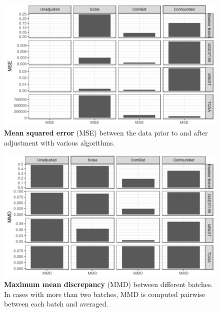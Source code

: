 \documentclass[notitlepage]{article}
\begin{document}
\begin{figure}
	\centering
	\includegraphics[width=4.5in]{figures/rough/mse}
	\caption{\textbf{Mean squared error} (MSE) between the data prior to and after adjustment with various algorithms.}
	\label{fig:mse}
\end{figure}
\begin{figure}
	\centering
	\includegraphics[width=4.5in]{figures/rough/mmd}
	\caption{\textbf{Maximum mean discrepancy} (MMD) between different batches.
	In cases with more than two batches, MMD is computed pairwise between each batch and averaged.}
	\label{fig:mmd}
\end{figure}
\end{document}
